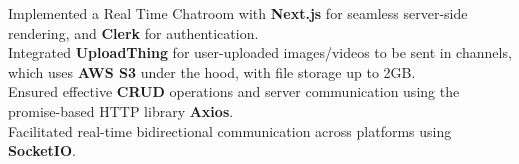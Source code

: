 \documentclass[]{Nikhil_Kadiyan_Resume}
\begin{document}

{}
\pt Implemented a Real Time Chatroom with \textbf{Next.js} for seamless server-side rendering, and \textbf{Clerk} for authentication.\\
\pt Integrated \textbf{UploadThing} for user-uploaded images/videos to be sent in channels, which uses \textbf{AWS S3} under the hood, with file storage up to 2GB.\\
\pt Ensured effective \textbf{CRUD} operations and server communication using the promise-based HTTP library \textbf{Axios}.\\
\pt Facilitated real-time bidirectional communication across platforms using \textbf{SocketIO}.\\
\sectionsep
\end{document}
